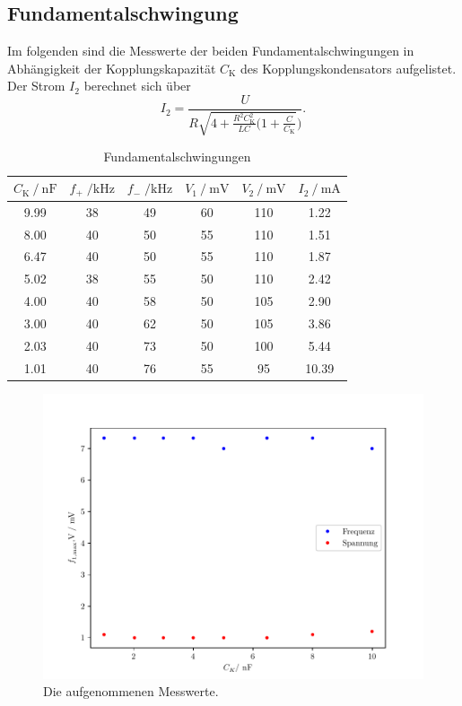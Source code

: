 \subsection{Fundamentalschwingung}
Im folgenden sind die Messwerte der beiden Fundamentalschwingungen in Abhängigkeit der Kopplungskapazität $C_{\text{K}}$ des Kopplungskondensators
aufgelistet. Der Strom $I_2$ berechnet sich über
\begin{equation}
  I_2  = \frac{U}{R\sqrt{4 + \frac{R^2C_{\text{K}}^2}{LC}(1 + \frac{C}{C_{\text{K}}}})}.
\end{equation}

\begin{table}[H]
  \centering
  \caption{Fundamentalschwingungen}
  \label{tab:aufgabeC}
  \begin{tabular}{c c c c c c}
      \toprule
      {$C_{\text{K}} \:/\: \si{\nano\farad}$} & {$f_+\;/ \si{\kilo\hertz}$} & {$f_-\;/ \si{\kilo\hertz}$} & {$V_1 \:/\: \si{\milli\volt}$} & {$V_2 \:/\: \si{\milli\volt}$} & $I_2 \:/\:\si{\milli\ampere}$ \\
      \midrule
      9.99 & 38 & 49 & 60 & 110 & 1.22 \\
      8.00 & 40 & 50 & 55 & 110 & 1.51 \\
      6.47 & 40 & 50 & 55 & 110 & 1.87 \\
      5.02 & 38 & 55 & 50 & 110 & 2.42 \\
      4.00 & 40 & 58 & 50 & 105 & 2.90 \\
      3.00 & 40 & 62 & 50 & 105 & 3.86 \\
      2.03 & 40 & 73 & 50 & 100 & 5.44 \\
      1.01 & 40 & 76 & 55 & 95 & 10.39 \\
      \bottomrule
  \end{tabular}
\end{table}


\begin{figure}[H]
  \centering
  \includegraphics{freq1.pdf}
  \caption{Die aufgenommenen Messwerte.}
  \label{fig:freq1}
\end{figure}

